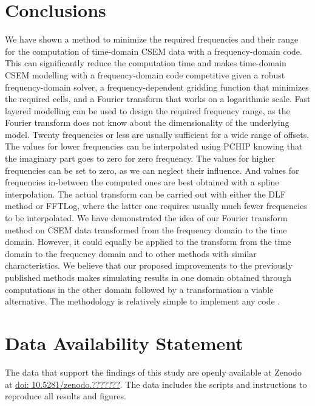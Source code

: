 \documentclass[extra, camera,%
    onecolumn,   %
    referee,     %
]{gji}
\begin{document}
\section{Conclusions} %

We have shown a method to minimize the required frequencies and their range for
the computation of time-domain CSEM data with a frequency-domain code. This can
significantly reduce the computation time and makes time-domain CSEM modelling
with a frequency-domain code competitive given a robust frequency-domain
solver, a frequency-dependent gridding function that minimizes the required
cells, and a Fourier transform that works on a logarithmic scale. Fast layered
modelling can be used to design the required frequency range, as the Fourier
transform does not know about the dimensionality of the underlying model.
Twenty frequencies or less are usually sufficient for a wide range of offsets.
The values for lower frequencies can be interpolated using PCHIP knowing that
the imaginary part goes to zero for zero frequency. The values for higher
frequencies can be set to zero, as we can neglect their influence. And values
for frequencies in-between the computed ones are best obtained with a spline
interpolation. The actual transform can be carried out with either the DLF
method or FFTLog, where the latter one requires usually much fewer frequencies
to be interpolated. We have demonstrated the idea of our Fourier transform
method on CSEM data transformed from the frequency domain to the time domain.
However, it could equally be applied to the transform from the time domain to
the frequency domain and to other methods with similar characteristics. We
believe that our proposed improvements to the previously published methods
makes simulating results in one domain obtained through computations in the
other domain followed by a transformation a viable alternative. The methodology
is relatively simple to implement   any  code .

\section{Data Availability Statement} %

The data that support the findings of this study are openly available at Zenodo
at \href{https://zenodo.org/badge/DOI/10.5281/zenodo.???????}{doi:
10.5281/zenodo.???????}. The data includes the scripts and instructions to
reproduce all results and figures.
\end{document}
